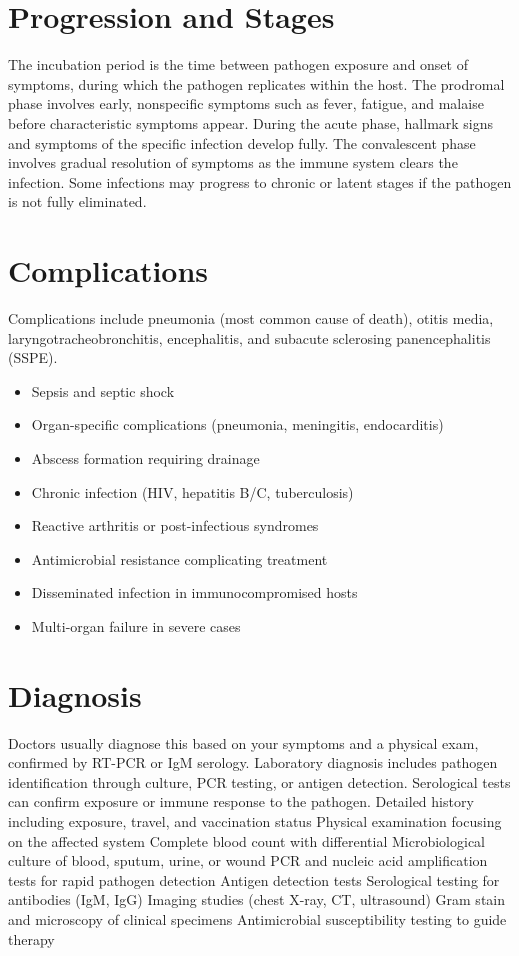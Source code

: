 \section{Progression and Stages}
The incubation period is the time between pathogen exposure and onset of symptoms, during which the pathogen replicates within the host. The prodromal phase involves early, nonspecific symptoms such as fever, fatigue, and malaise before characteristic symptoms appear. During the acute phase, hallmark signs and symptoms of the specific infection develop fully. The convalescent phase involves gradual resolution of symptoms as the immune system clears the infection. Some infections may progress to chronic or latent stages if the pathogen is not fully eliminated.
\section{Complications}
Complications include pneumonia (most common cause of death), otitis media, laryngotracheobronchitis, encephalitis, and subacute sclerosing panencephalitis (SSPE).

\begin{itemize}[noitemsep]
  \item Sepsis and septic shock
  \item Organ-specific complications (pneumonia, meningitis, endocarditis)
  \item Abscess formation requiring drainage
  \item Chronic infection (HIV, hepatitis B/C, tuberculosis)
  \item Reactive arthritis or post-infectious syndromes
  \item Antimicrobial resistance complicating treatment
  \item Disseminated infection in immunocompromised hosts
  \item Multi-organ failure in severe cases
\end{itemize}
\section{Diagnosis}
Doctors usually diagnose this based on your symptoms and a physical exam, confirmed by RT-PCR or IgM serology. Laboratory diagnosis includes pathogen identification through culture, PCR testing, or antigen detection. Serological tests can confirm exposure or immune response to the pathogen. Detailed history including exposure, travel, and vaccination status Physical examination focusing on the affected system Complete blood count with differential Microbiological culture of blood, sputum, urine, or wound PCR and nucleic acid amplification tests for rapid pathogen detection Antigen detection tests Serological testing for antibodies (IgM, IgG) Imaging studies (chest X-ray, CT, ultrasound) Gram stain and microscopy of clinical specimens Antimicrobial susceptibility testing to guide therapy


